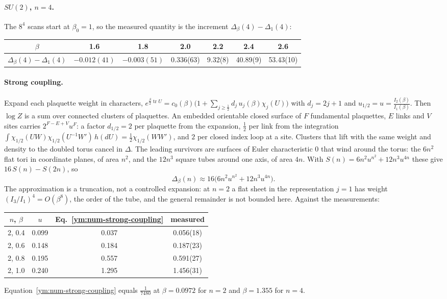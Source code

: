\paragraph{$SU(2)$, $n=4$.} The $8^4$ scans start at $\beta_0=1$, so the
measured quantity is the increment $\Delta_\beta(4)-\Delta_{1}(4)$:
\begin{center}
\begin{tabular}{ccccccc}
$\beta$ & 1.6 & 1.8 & 2.0 & 2.2 & 2.4 & 2.6\\\hline
$\Delta_\beta(4)-\Delta_1(4)$ & $-0.012(41)$ & $-0.003(51)$ & 0.336(63) &
 9.32(8) & 40.89(9) & 53.43(10)
\end{tabular}
\end{center}

\paragraph{Strong coupling.} Expand each plaquette weight in characters,
$e^{\frac\beta2\operatorname{tr}U}=c_0(\beta)\big(1+\sum_{j\ge\frac12}d_j\,
u_j(\beta)\chi_j(U)\big)$ with $d_j=2j+1$ and $u_{1/2}=u=\frac{I_2(\beta)}
{I_1(\beta)}$. Then $\log Z$ is a sum over connected clusters of plaquettes.
An embedded orientable closed surface of $F$ fundamental plaquettes, $E$ links
and $V$ sites carries $2^{F-E+V}u^F$: a factor $d_{1/2}=2$ per plaquette from
the expansion, $\frac12$ per link from the integration
$\int\chi_{1/2}(UW)\chi_{1/2}(U^{-1}W')\,h(dU)=\frac12\chi_{1/2}(WW')$, and $2$
per closed index loop at a site. Clusters that lift with the same weight and
density to the doubled torus cancel in $\Delta$. The leading survivors are
surfaces of Euler characteristic $0$ that wind around the torus: the $6n^2$
flat tori in coordinate planes, of area $n^2$, and the $12n^3$ square tubes
around one axis, of area $4n$. With
$S(n)=6n^2u^{n^2}+12n^3u^{4n}$ these give $16\,S(n)-S(2n)$, so
\begin{equation}\label{ym:num-strong-coupling}
 \Delta_\beta(n)\approx16\big(6n^2u^{n^2}+12n^3u^{4n}\big).
\end{equation}
The approximation is a truncation, not a controlled expansion: at $n=2$ a
flat sheet in the representation $j=1$ has weight $(I_3/I_1)^4=O(\beta^8)$, the
order of the tube, and the general remainder is not bounded here. Against the
measurements:
\begin{center}
\begin{tabular}{cccc}
$n$, $\beta$ & $u$ & Eq.~\eqref{ym:num-strong-coupling} & measured\\\hline
2, 0.4 & 0.099 & 0.037 & 0.056(18)\\
2, 0.6 & 0.148 & 0.184 & 0.187(23)\\
2, 0.8 & 0.195 & 0.557 & 0.591(27)\\
2, 1.0 & 0.240 & 1.295 & 1.456(31)
\end{tabular}
\end{center}
Equation~\eqref{ym:num-strong-coupling} equals $\frac1{7480}$ at
$\beta=0.0972$ for $n=2$ and $\beta=1.355$ for $n=4$.

